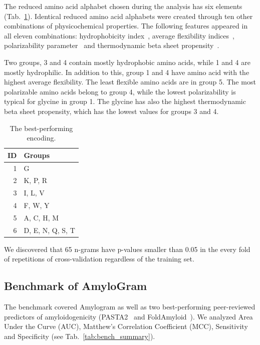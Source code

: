 \documentclass{bioinfo}
\begin{document}
The reduced amino acid alphabet chosen during the analysis has six elements 
(Tab.~\ref{tab:best_enc}). Identical reduced amino acid alphabets were created through ten other combinations 
of physicochemical properties. The following features appeared in all eleven combinations:
hydrophobicity index~\citep{argos_structural_1982}, average flexibility 
indices~\citep{bhaskaran_positional_1988}, polarizability 
parameter~\citep{charton_structural_1982} and thermodynamic beta sheet 
propensity~\citep{kim_thermodynamic_1993}.

  Two groups, 3 and 4 contain mostly hydrophobic amino acids, while 1 and 4 
are mostly hydrophilic. In addition to this, group 1 and 4 have amino acid with 
the highest average flexibility. The least flexible amino acids are in group 5. 
The most polarizable amino acids belong to group 4, while the lowest polarizability 
is typical for glycine in group 1. The glycine has also the highest thermodynamic beta sheet 
propensity, which has the lowest values for groups 3 and 4.

\begin{table}[ht]
\centering
\caption{The best-performing encoding.} 
\label{tab:best_enc}
\begin{tabular}{rl}
\toprule
ID & Groups \\ 
\midrule
  1 & G \\ 
\rowcolor[gray]{0.85}  2 & K, P, R \\ 
3 & I, L, V \\ 
\rowcolor[gray]{0.85}  4 & F, W, Y \\ 
5 & A, C, H, M \\ 
\rowcolor[gray]{0.85}  6 & D, E, N, Q, S, T \\ 
\bottomrule
\end{tabular}
\end{table}

  We discovered that 65 n-grams have p-values smaller than 0.05 
in the every fold of repetitions of cross-validation regardless of the training set. 



\subsection{Benchmark of AmyloGram}

The benchmark covered Amylogram as well as two best-performing peer-reviewed 
predictors of amyloidogenicity (PASTA2~\citep{walsh_pasta_2014} and 
FoldAmyloid~\citep{garbuzynskiy_foldamyloid:_2010}). We analyzed Area Under the 
Curve (AUC), Matthew's Correlation Coefficient (MCC), Sensitivity and 
Specificity (see Tab.~\ref{tab:bench_summary}).
    
\end{document}
